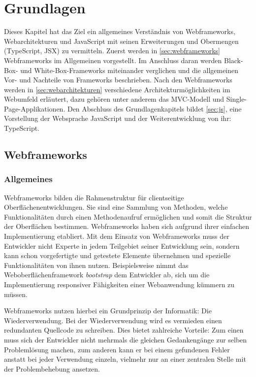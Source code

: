 
\chapter{Grundlagen}

Dieses Kapitel hat das Ziel ein allgemeines Verständnis von Webframeworks, Webarchitekturen und JavaScript mit seinen Erweiterungen und Obermengen (TypeScript, JSX) zu vermitteln. Zuerst werden in \autoref{sec:webframeworks} Webframeworks im Allgemeinen vorgestellt. Im Anschluss daran werden Black-Box- und White-Box-Frameworks miteinander verglichen und die allgemeinen Vor- und Nachteile von Frameworks beschrieben. Nach den Webframeworks werden in \autoref{sec:webarchitekturen} verschiedene Architekturmöglichkeiten im Webumfeld erläutert, dazu gehören unter anderem das MVC-Modell und Single-Page-Applikationen. Den Abschluss des Grundlagenkapitels bildet \autoref{sec:js}, eine Vorstellung der Websprache JavaScript und der Weiterentwicklung von ihr: TypeScript. 

\section{Webframeworks}\label{sec:webframeworks}

\subsection{Allgemeines}

Webframeworks bilden die Rahmenstruktur für clientseitige Oberflächenentwicklungen. Sie sind eine Sammlung von Methoden, welche Funktionalitäten durch einen Methodenaufruf ermöglichen und somit die Struktur der Oberflächen bestimmen. Webframeworks haben sich aufgrund ihrer einfachen Implementierung etabliert. Mit dem Einsatz von Webframeworks muss der Entwickler nicht Experte in jedem Teilgebiet seiner Entwicklung sein, sondern kann schon vorgefertigte und getestete Elemente übernehmen und spezielle Funktionalitäten von ihnen nutzen. Beispielsweise nimmt das Weboberflächenframework \textit{bootstrap} dem Entwickler ab, sich um die Implementierung responsiver Fähigkeiten einer Webanwendung kümmern zu müssen.\autocites[vgl.][312\psqq]{Schatten2010}

Webframeworks nutzen hierbei ein Grundprinzip der Informatik: Die Wiederverwendung. Bei der Wiederverwendung wird es vermieden einen redundanten Quellcode zu schreiben. Dies bietet zahlreiche Vorteile: Zum einen muss sich der Entwickler nicht mehrmals die gleichen Gedankengänge zur selben Problemlösung machen, zum anderen kann er bei einem gefundenen Fehler anstatt bei jeder Verwendung einzeln, vielmehr nur an einer zentralen Stelle mit der Problembehebung ansetzen.\autocites[vgl.][302\psqq]{Schatten2010}

